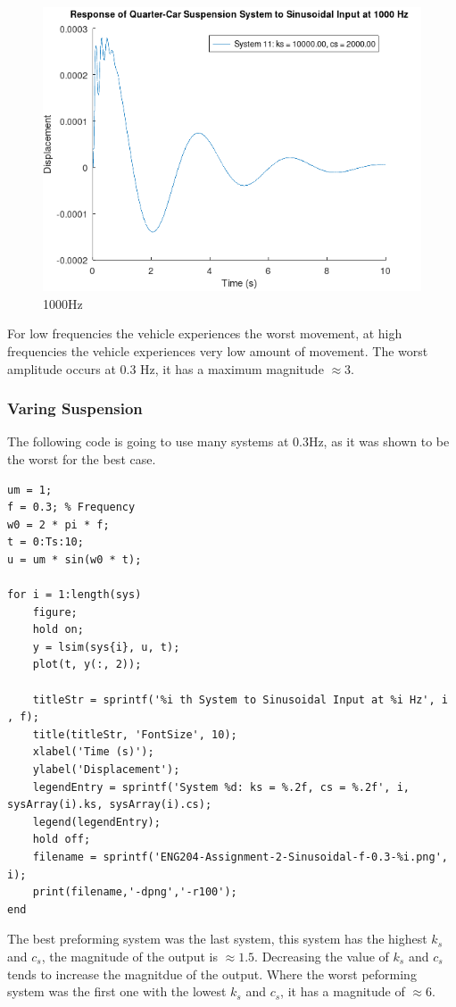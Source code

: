 \documentclass[11pt]{article}
\begin{document}
\begin{figure}[H]
    \centering
    \includegraphics[width=.9\linewidth]{ENG204-Assignment-2-Sinusoidal-f-1000.png}
    \caption{1000Hz}
    \label{fig:1000hz}
\end{figure}

For low frequencies the vehicle experiences the worst movement, at high frequencies the vehicle experiences very low amount of movement. The worst amplitude occurs at 0.3 Hz, it has a maximum magnitude \(\approx 3\).
\subsubsection{Varing Suspension}
\label{sec:org70c3b0a}
The following code is going to use many systems at 0.3Hz, as it was shown to be the worst for the best case.
\begin{verbatim}
um = 1;
f = 0.3; % Frequency
w0 = 2 * pi * f;
t = 0:Ts:10;
u = um * sin(w0 * t);

for i = 1:length(sys)
    figure;
    hold on;
    y = lsim(sys{i}, u, t);
    plot(t, y(:, 2));

    titleStr = sprintf('%i th System to Sinusoidal Input at %i Hz', i , f);
    title(titleStr, 'FontSize', 10);
    xlabel('Time (s)');
    ylabel('Displacement');
    legendEntry = sprintf('System %d: ks = %.2f, cs = %.2f', i, sysArray(i).ks, sysArray(i).cs);
    legend(legendEntry);
    hold off;
    filename = sprintf('ENG204-Assignment-2-Sinusoidal-f-0.3-%i.png', i);
    print(filename,'-dpng','-r100');
end
\end{verbatim}

The best preforming system was the last system, this system has the highest \(k_s\) and \(c_s\), the magnitude of the output is \(\approx 1.5\). Decreasing the value of \(k_s\) and \(c_s\) tends to increase the magnitdue of the output. Where the worst peforming system was the first one with the lowest  \(k_s\) and \(c_s\), it has a magnitude of \(\approx 6\).
\end{document}
